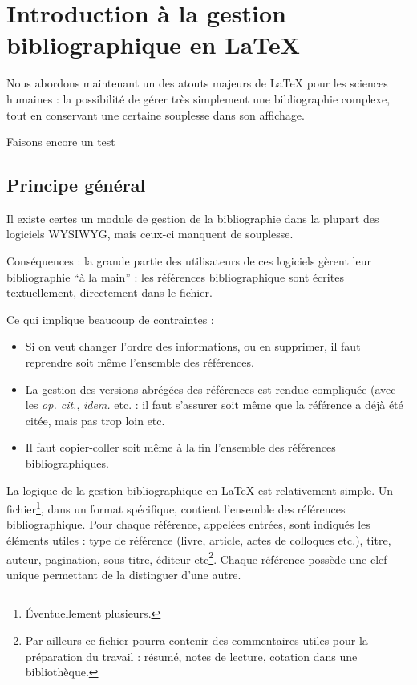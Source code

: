 \chapter[Introduction]{Introduction à la gestion bibliographique en \LaTeX{}}
\begin{prealable}
Nous abordons maintenant un des atouts majeurs de \LaTeX{} pour les sciences humaines : la possibilité de gérer très simplement une bibliographie complexe, tout en conservant une certaine souplesse dans son affichage.

Faisons encore un test
\end{prealable}
\section{Principe général}



Il existe certes un module de gestion de la bibliographie dans la plupart des logiciels WYSIWYG, mais ceux-ci manquent de souplesse.

Conséquences : la grande partie des utilisateurs de ces logiciels gèrent leur bibliographie \enquote{à la main} : les références bibliographique sont écrites textuellement, directement dans le fichier. 

Ce qui implique beaucoup de contraintes  :
\begin{itemize}
\item Si on veut changer l'ordre des informations, ou en supprimer, il faut reprendre soit même l'ensemble des références.
\item La gestion des versions abrégées des références est rendue compliquée (avec les \emph{op. cit.}, \emph{idem.} etc. :  il faut s'assurer soit même que la référence a déjà été citée, mais pas trop loin etc. 
\item Il faut copier-coller soit même à la fin l'ensemble des références bibliographiques. 
\end{itemize}

La logique de la gestion bibliographique en \LaTeX{} est relativement simple. Un fichier\footnote{Éventuellement plusieurs.}, dans un format spécifique, contient l'ensemble des références bibliographique. Pour chaque référence, appelées entrées, sont indiqués les éléments utiles :  type de référence (livre, article, actes de colloques etc.), titre, auteur, pagination, sous-titre, éditeur etc\footnote{Par ailleurs ce fichier pourra contenir des commentaires utiles pour la préparation du travail : résumé, notes de lecture, cotation dans une bibliothèque.}. Chaque référence possède une clef unique permettant de la distinguer d'une autre.

